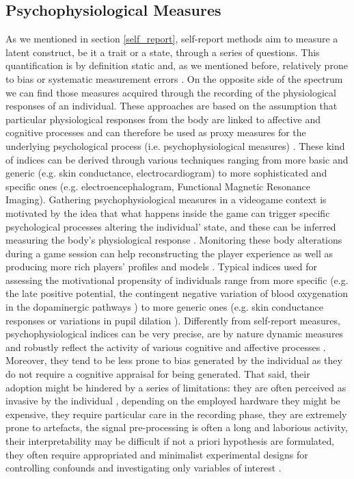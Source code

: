 \subsection{Psychophysiological Measures}
\label{psychophisio} 
As we mentioned in section \ref{self_report}, self-report methods aim to measure a latent construct, be it a trait or a state, through a series of questions. This quantification is by definition static and, as we mentioned before, relatively prone to bias or systematic measurement errors \cite{van2009psychologically}. On the opposite side of the spectrum we can find those measures acquired through the recording of the physiological responses of an individual. These approaches are based on the assumption that particular physiological responses from the body are linked to affective and cognitive processes and can therefore be used as proxy measures for the underlying psychological process (i.e. psychophysiological measures) \cite{cacioppo2007handbook}. These kind of indices can be derived through various techniques ranging from more basic and generic (e.g. skin conductance, electrocardiogram) to more sophisticated and specific ones (e.g. electroencephalogram, Functional Magnetic Resonance Imaging). Gathering psychophysiological measures in a videogame context is motivated by the idea that what happens inside the game can trigger specific psychological processes altering the individual' state, and these can be inferred measuring the body’s physiological response \cite{yannakakis2013player}. Monitoring these body alterations during a game session can help reconstructing the player experience \cite{mirza2013does} as well as producing more rich players’ profiles and models \cite{yannakakis2013player}. Typical indices used for assessing the motivational propensity of individuals range from more specific (e.g. the late positive potential, the contingent negative variation of blood oxygenation in the dopaminergic pathways \cite{cacioppo2007handbook}) to more generic ones (e.g. skin conductance responses or variations in pupil dilation \cite{cacioppo2007handbook}). Differently from self-report measures, psychophysiological indices can be very precise, are by nature dynamic measures and robustly reflect the activity of various cognitive and affective processes \cite{cacioppo2007handbook}. Moreover, they tend to be less prone to bias generated by the individual as they do not require a cognitive appraisal for being generated. That said, their adoption might be hindered by a series of limitations: they are often perceived as invasive by the individual \cite{yannakakis2013player}, depending on the employed hardware they might be expensive, they require particular care in the recording phase, they are extremely prone to artefacts, the signal pre-processing is often a long and laborious activity, their interpretability may be difficult if not a priori hypothesis are formulated, they often require appropriated and minimalist experimental designs for controlling confounds and investigating only variables of interest \cite{liu2017toward}.
    
